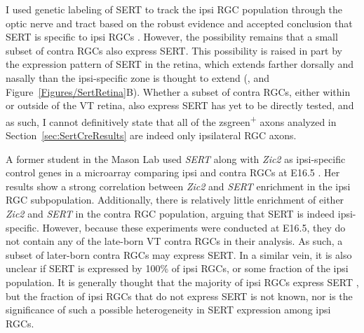 \label{sec:TechnicalSERT}
I used genetic labeling of SERT to track the ipsi RGC population through the optic nerve and tract based on the robust evidence and accepted conclusion that SERT is specific to ipsi RGCs \cite{upton1999excess,garcia2010zic2,koch2011pathway}.
However, the possibility remains that a small subset of contra RGCs also express SERT.
This possibility is raised in part by the expression pattern of SERT in the retina, which extends farther dorsally and nasally than the ipsi-specific zone is thought to extend (, and Figure~\ref{Figures/SertRetina}B).
Whether a subset of contra RGCs, either within or outside of the VT retina, also express SERT has yet to be directly tested, and as such, I cannot definitively state that all of the zsgreen\textsuperscript{+} axons analyzed in Section~\ref{sec:SertCreResults} are indeed only ipsilateral RGC axons.

A former student in the Mason Lab used \emph{SERT} along with \emph{Zic2} as ipsi-specific control genes in a microarray comparing ipsi and contra RGCs at E16.5 \cite{wang2016ipsilateral}.
Her results show a strong correlation between \emph{Zic2} and \emph{SERT} enrichment in the ipsi RGC subpopulation.
Additionally, there is relatively little enrichment of either \emph{Zic2} and \emph{SERT} in the contra RGC population, arguing that SERT is indeed ipsi-specific.
However, because these experiments were conducted at E16.5, they do not contain any of the late-born VT contra RGCs in their analysis.
As such, a subset of later-born contra RGCs may express SERT.
In a similar vein, it is also unclear if SERT is expressed by 100\% of ipsi RGCs, or some fraction of the ipsi population.
It is generally thought that the majority of ipsi RGCs express SERT \cite{garcia2010zic2,koch2011pathway}, but the fraction of ipsi RGCs that do not express SERT is not known, nor is the significance of such a possible heterogeneity in SERT expression among ipsi RGCs.

